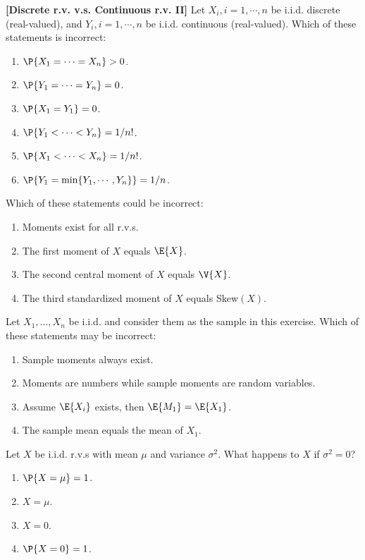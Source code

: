 \documentclass[poll_tutorial_format]{subfiles}
\begin{document}
		
				\begin{exercise}
			\textbf{[Discrete r.v. v.s. Continuous r.v. II]}
			Let $X_i, i=1,\cdots, n$ be i.i.d. discrete (real-valued), and $Y_i, i=1,\cdots, n$ be i.i.d. continuous (real-valued).
			Which of these statements is incorrect: 
			\begin{enumerate}
				\item $\P{X_1=\cdots =X_n}>0$.
				\item $\P{Y_1=\cdots =Y_n}=0$.
				\item $\P{X_1=Y_1}=0$.
				\item $\P{Y_1<\cdots <Y_n}=1/n!$.
				\item $\P{X_1<\cdots <X_n}=1/n!$.
				\item $\P{Y_1=\min\{Y_1, \cdots, Y_n\}}=1/n$.  
			\end{enumerate}
		\end{exercise}
		
	
	\begin{exercise}
		Which of these statements could be incorrect:
		\begin{enumerate}
			\item Moments exist for all r.v.s.
			\item The first moment of $X$ equals $\E{X}$.
			\item The second central moment of $X$ equals $\V{X}$.
			\item The third standardized moment of $X$ equals Skew$(X)$. 
		\end{enumerate}
	\end{exercise}
	
	
	\begin{exercise}
		Let $X_1, . . . ,X_n$ be i.i.d. and consider them as the sample in this exercise.
		Which of these statements may be incorrect: 
		\begin{enumerate}
			\item Sample moments always exist.
			\item Moments are numbers while sample moments are random variables.
			\item Assume $\E{X_i}$ exists, then $\E{M_1}=\E{X_1}$.
			\item The sample mean equals the mean of $X_1$. 
		\end{enumerate}
	\end{exercise}
	
	
			\begin{exercise}
		Let $X$ be i.i.d. r.v.s with mean $\mu$ and variance $\sigma^2$. What happens to $X$ if $\sigma^2 =0$? 
		\begin{enumerate}
			\item $\P{X=\mu}=1$. 
			\item $X=\mu$.			
			\item $X=0$.			
			\item $\P{X=0}=1$.			
		\end{enumerate}
	\end{exercise}
	
\end{document}
